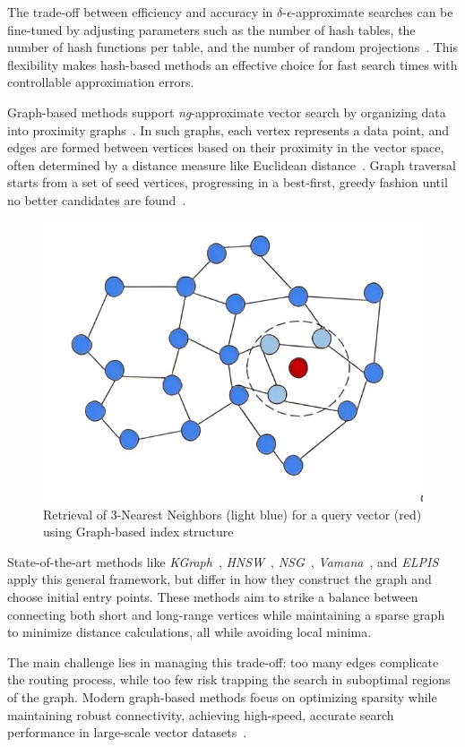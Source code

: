 The trade-off between efficiency and accuracy in \(\delta\)-\(\epsilon\)-approximate searches can be fine-tuned by adjusting parameters such as the number of hash tables, the number of hash functions per table, and the number of random projections~\cite{qalsh,hydra2}. This flexibility makes hash-based methods an effective choice for fast search times with controllable approximation errors.

 Graph-based methods support \textit{ng}-approximate vector search by organizing data into proximity graphs~\cite{gabriel69,toussaint02}. In such graphs, each vertex represents a data point, and edges are formed between vertices based on their proximity in the vector space, often determined by a distance measure like Euclidean distance~\cite{edelsbrunner87}. Graph traversal starts from a set of seed vertices, progressing in a best-first, greedy fashion until no better candidates are found~\cite{beamsearch}.

\begin{figure}[ht] 
\centering
		\captionsetup{justification=centering}
		\includegraphics[width=0.5\columnwidth]{../img/related/graphb.jpg}
		\caption{Retrieval of 3-Nearest Neighbors (light blue) for a query vector (red) using Graph-based index structure}        
		\label{fig:graph_retrieval}
\end{figure}

State-of-the-art methods like \textit{KGraph}~\cite{kgraph}, \textit{HNSW}~\cite{hnsw}, \textit{NSG}~\cite{nsg}, \textit{Vamana}~\cite{vamana}, and \textit{ELPIS}~\cite{elpis} apply this general framework, but differ in how they construct the graph and choose initial entry points. These methods aim to strike a balance between connecting both short and long-range vertices while maintaining a sparse graph to minimize distance calculations, all while avoiding local minima.

The main challenge lies in managing this trade-off: too many edges complicate the routing process, while too few risk trapping the search in suboptimal regions of the graph. Modern graph-based methods focus on optimizing sparsity while maintaining robust connectivity, achieving high-speed, accurate search performance in large-scale vector datasets~\cite{hydra2,hnsw,nsg}.

